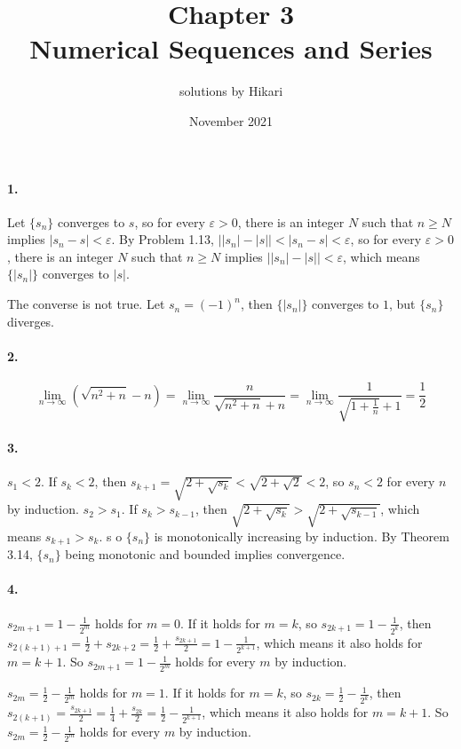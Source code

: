 \documentclass[a4paper]{article}
\title{Chapter 3\\Numerical Sequences and Series}
\author{solutions by Hikari}
\date{November 2021}
\begin{document}
\newcommand{\V}{\mathbf}

\maketitle

\paragraph{1.}
Let $\{s_n\}$ converges to $s$, so for every $\varepsilon>0$, there is an integer $N$ such that $n\geq N$ implies $|s_n-s|<\varepsilon$. By Problem 1.13, $\big||s_n|-|s| \big|<|s_n-s|<\varepsilon$, so for every $\varepsilon>0$, there is an integer $N$ such that $n\geq N$ implies $\big||s_n|-|s| \big|<\varepsilon$, which means $\{|s_n|\}$ converges to $|s|$.

The converse is not true. Let $s_n=(-1)^n$, then $\{|s_n|\}$ converges to $1$, but $\{s_n\}$ diverges.

\paragraph{2.}
\[
\lim_{n\to\infty}(\sqrt{n^2+n}-n)=\lim_{n\to\infty}\frac{n}{\sqrt{n^2+n}+n}=\lim_{n\to\infty}\frac{1}{\sqrt{1+\frac{1}{n}}+1}=\frac{1}{2}
\]

\paragraph{3.}
$s_1<2$. If $s_k<2$, then $s_{k+1}=\sqrt{2+\sqrt{s_k}}<\sqrt{2+\sqrt{2}}<2$, so $s_n<2$ for every $n$ by induction. $s_2>s_1$. If $s_k>s_{k-1}$, then $\sqrt{2+\sqrt{s_k}}>\sqrt{2+\sqrt{s_{k-1}}}$, which means $s_{k+1}>s_k$. s o $\{s_n\}$ is monotonically increasing by induction. By Theorem 3.14, $\{s_n\}$ being monotonic and bounded implies convergence.

\paragraph{4.}
$s_{2m+1}=1-\frac{1}{2^m}$ holds for $m=0$. If it holds for $m=k$, so $s_{2k+1}=1-\frac{1}{2^k}$, then $s_{2(k+1)+1}=\frac{1}{2}+s_{2k+2}=\frac{1}{2}+\frac{s_{2k+1}}{2}=1-\frac{1}{2^{k+1}}$, which means it also holds for $m=k+1$. So $s_{2m+1}=1-\frac{1}{2^m}$ holds for every $m$ by induction.

$s_{2m}=\frac{1}{2}-\frac{1}{2^m}$ holds for $m=1$. If it holds for $m=k$, so $s_{2k}=\frac{1}{2}-\frac{1}{2^k}$, then $s_{2(k+1)}=\frac{s_{2k+1}}{2}=\frac{1}{4}+\frac{s_{2k}}{2}=\frac{1}{2}-\frac{1}{2^{k+1}}$, which means it also holds for $m=k+1$. So $s_{2m}=\frac{1}{2}-\frac{1}{2^m}$ holds for every $m$ by induction. 
\end{document}
